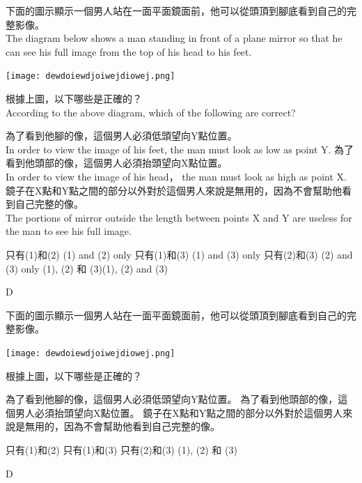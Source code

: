 {
    下面的圖示顯示一個男人站在一面平面鏡面前，他可以從頭頂到腳底看到自己的完整影像。\\The diagram below shows a man standing in front of a plane mirror so that he can see his full image from the top of his head to his feet.
        {\par\centering
            \texttt{[image: dewdoiewdjoiwejdiowej.png]}\par}
    根據上圖，以下哪些是正確的？\\According to the above diagram, which of the following are correct?
    \begin{statements}
        \task 為了看到他腳的像，這個男人必須低頭望向Y點位置。\\In order to view the image of his feet, the man must look as low as point Y.
        \task 為了看到他頭部的像，這個男人必須抬頭望向X點位置。\\In order to view the image of his head， the man must look as high as point X.
        \task 鏡子在X點和Y點之間的部分以外對於這個男人來說是無用的，因為不會幫助他看到自己完整的像。\\The portions of mirror outside the length between points X and Y are useless for the man to see his full image.
    \end{statements}
    \begin{tasks}
        \task 只有(1)和(2) \tab (1) and (2) only
        \task 只有(1)和(3) \tab (1) and (3) only
        \task 只有(2)和(3) \tab (2) and (3) only
        \task (1), (2) 和 (3)\tab (1), (2) and (3)
    \end{tasks}
}
{\mckey D}
{
下面的圖示顯示一個男人站在一面平面鏡面前，他可以從頭頂到腳底看到自己的完整影像。
{\par\centering
\texttt{[image: dewdoiewdjoiwejdiowej.png]}\par}
根據上圖，以下哪些是正確的？
\begin{statements}
    \task 為了看到他腳的像，這個男人必須低頭望向Y點位置。
    \task 為了看到他頭部的像，這個男人必須抬頭望向X點位置。
    \task 鏡子在X點和Y點之間的部分以外對於這個男人來說是無用的，因為不會幫助他看到自己完整的像。
\end{statements}
\begin{tasks}
    \task 只有(1)和(2)
    \task 只有(1)和(3)
    \task 只有(2)和(3)
    \task (1), (2) 和 (3)
\end{tasks}
}
{\mckey D}

